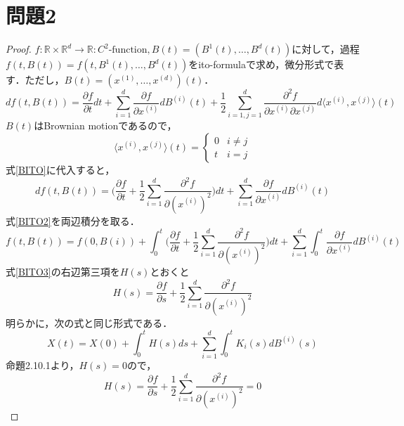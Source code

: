 \documentclass[a4paper,11pt]{jsarticle}
\numberwithin{theorem}{section}  %
\numberwithin{equation}{section} %
\begin{document}
\section{問題2}
\begin{proof}
$f:\mathbb{R}\times\mathbb{R}^d \to \mathbb{R}:C^2\text{-function},B(t)=(B^1(t),\dots,B^d(t))$に対して，過程$f(t,B(t))=f(t,B^1(t),\dots,B^d(t))$をito-formulaで求め，微分形式で表す．ただし，$B(t)=(x^{(1)},\dots,x^{(d)})(t)$．
\begin{equation}
df(t,B(t)) = \frac{\partial f}{\partial t} dt + \sum_{i=1}^d \frac{\partial f}{\partial x^{(i)}} d B^{(i)}(t) + \frac{1}{2}\sum_{i=1,j=1}^d \frac{\partial^2 f}{\partial x^{(i)} \partial x^{(j)}} d \langle x^{(i)}, x^{(j)}\rangle (t)
\label{BITO}
\end{equation}
$B(t)$はBrownian motionであるので，
\[
\langle x^{(i)}, x^{(j)}\rangle (t) = \begin{cases}
0 & i \neq j\\
t & i = j
\end{cases}
\]
式\eqref{BITO}に代入すると，
\begin{equation}
df(t,B(t)) = \Bigr( \frac{\partial f}{\partial t}+ \frac{1}{2}\sum_{i=1}^d \frac{\partial^2 f}{\partial (x^{(i)})^2} \Bigr)dt +  \sum_{i=1}^d \frac{\partial f}{\partial x^{(i)}} d B^{(i)}(t)
\label{BITO2}
\end{equation}
式\eqref{BITO2}を両辺積分を取る．
\begin{equation}
f(t,B(t)) = f(0,B(i)) + \int_0^t \Bigr( \frac{\partial f}{\partial t}+ \frac{1}{2}\sum_{i=1}^d \frac{\partial^2 f}{\partial (x^{(i)})^2} \Bigr)dt + \sum_{i=1}^d \int_0^t  \frac{\partial f}{\partial x^{(i)}} d B^{(i)}(t)
\label{BITO3}
\end{equation}
式\eqref{BITO3}の右辺第三項を$H(s)$とおくと
\begin{equation}
H(s) = \frac{\partial f}{\partial s}+ \frac{1}{2}\sum_{i=1}^d \frac{\partial^2 f}{\partial (x^{(i)})^2}
\end{equation}
明らかに，次の式と同じ形式である．
\begin{equation}
X(t) = X(0) + \int_0^t H(s)ds + \sum_{i=1}^d \int_0^t K_i(s)dB^{(i)}(s)
\end{equation}
命題2.10.1より，$H(s)=0$ので，
\begin{equation}
H(s) = \frac{\partial f}{\partial s}+ \frac{1}{2}\sum_{i=1}^d \frac{\partial^2 f}{\partial (x^{(i)})^2} = 0
\end{equation}
\end{proof}
\end{document}
